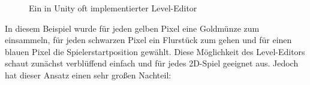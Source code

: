 \begin{figure}[h]
    \begin{minipage}[t]{0.49\textwidth}
    \end{minipage}
    \hfill
    \begin{minipage}[t]{0.49\textwidth}
    \end{minipage}
    \caption[Ein in Unity oft implementierter Level-Editor]{Ein in Unity oft implementierter Level-Editor\cite{Brackeys.2017}}
\end{figure} 

In diesem Beispiel wurde für jeden gelben Pixel eine Goldmünze zum einsammeln, für jeden schwarzen Pixel ein Flurstück zum gehen und für einen blauen Pixel die Spielerstartposition gewählt. Diese Möglichkeit des Level-Editors schaut zunächst verblüffend einfach und für jedes 2D-Spiel geeignet aus. Jedoch hat dieser Ansatz einen sehr großen Nachteil:

